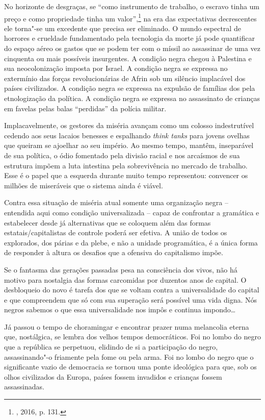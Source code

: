 No horizonte de desgraças, se ``como instrumento de trabalho, o escravo
tinha um preço e como propriedade tinha um valor'',\footnote{,
  2016, p. 131.} na era das expectativas decrescentes ele torna"-se um
excedente que precisa ser eliminado. O mundo espectral de horrores e
crueldade fundamentado pela tecnologia da morte já pode quantificar do
espaço aéreo os gastos que se podem ter com o míssil ao assassinar de
uma vez cinquenta ou mais possíveis insurgentes. A condição negra chegou
à Palestina e sua neocolonização imposta por Israel. A condição negra se
expressa no extermínio das forças revolucionárias de Afrin sob um
silêncio implacável dos países civilizados. A condição negra se expressa
na expulsão de famílias dos  pela etnologização da política. A
condição negra se expressa no assassinato de crianças em favelas pelas
balas ``perdidas'' da polícia militar.

Implacavelmente, os gestores da miséria avançam como um colosso
indestrutível cedendo aos seus lacaios benesses e espalhando \emph{think
tanks} para jovens ovelhas que queiram se ajoelhar ao seu império. Ao
mesmo tempo, mantêm, inseparável de sua política, o ódio fomentado pela
divisão racial e nos arcaísmos de sua estrutura impõem a luta intestina
pela sobrevivência no mercado de trabalho. Esse é o papel que a esquerda
durante muito tempo representou: convencer os milhões de miseráveis que
o sistema ainda é viável.

Contra essa situação de miséria atual somente uma organização negra --
entendida aqui como condição universalizada -- capaz de confrontar a
gramática e estabelecer desde já alternativas que se coloquem além das
formas estatais/capitalistas de controle poderá ser efetiva. A união de
todos os explorados, dos párias e da plebe, e não a unidade
programática, é a única forma de responder à altura os desafios que a
ofensiva do capitalismo impõe.

Se o fantasma das gerações passadas pesa na consciência dos vivos, não
há motivo para nostalgia das formas carcomidas por duzentos anos de
capital. O desbloqueio do novo é tarefa dos que se voltam contra a
universalidade do capital e que compreendem que só com sua superação
será possível uma vida digna. Nós negros sabemos o que essa
universalidade nos impôs e continua impondo\ldots{}

Já passou o tempo de choramingar e encontrar prazer numa melancolia
eterna que, nostálgica, se lembra dos velhos tempos democráticos. Foi no
lombo do negro que a república se perpetuou, elidindo de si a
participação do negro, assassinando"-o friamente pela fome ou pela arma.
Foi no lombo do negro que o
significante vazio de democracia se tornou uma ponte ideológica para
que, sob os olhos civilizados da Europa, países fossem invadidos e
crianças fossem assassinadas.


